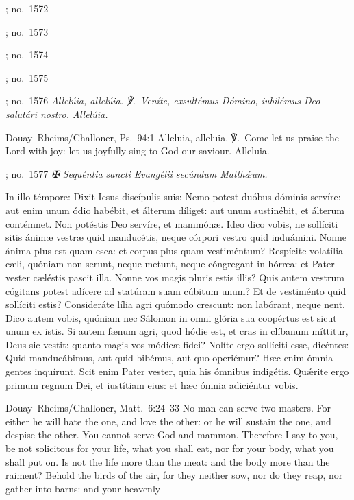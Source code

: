 \begin{massbox}{; no.~1572}
\begin{massbox}{; no.~1573}
\begin{massbox}{; no.~1574}
\begin{massbox}{; no.~1575}
\label{alleluia}
\begin{massbox}{; no.~1576}\itshape
Allelúia, allelúia. ℣.~Veníte, exsultémus Dómino, iubilémus Deo salutári
nostro. Allelúia.
\finishfulltextelement
\begin{fulltextenglish}{Douay--Rheims/Challoner, Ps.~94:1}
Alleluia, alleluia. ℣.~Come let us praise the Lord with joy: let us joyfully
sing to God our saviour. Alleluia.
\end{fulltextenglish}

\label{gospel}
\begin{massbox}{; no.~1577}\itshape
✠ Sequéntia sancti Evangélii secúndum Matthǽum.

In illo témpore: Dixit Iesus discípulis suis: Nemo potest duóbus dóminis
servíre: aut enim unum ódio habébit, et álterum díliget: aut unum sustinébit,
et álterum contémnet. Non potéstis Deo servíre, et mammónæ. Ideo dico vobis,
ne sollíciti sitis ánimæ vestræ quid manducétis, neque córpori vestro quid
induámini. Nonne ánima plus est quam esca: et corpus plus quam vestiméntum?
Respícite volatília cæli, quóniam non serunt, neque metunt, neque cóngregant
in hórrea: et Pater vester cæléstis pascit illa. Nonne vos magis pluris estis
illis? Quis autem vestrum cógitans potest adícere ad statúram suam cúbitum
unum? Et de vestiménto quid sollíciti estis? Consideráte lília agri quómodo
crescunt: non labórant, neque nent. Dico autem vobis, quóniam nec Sálomon in
omni glória sua coopértus est sicut unum ex istis. Si autem fænum agri, quod
hódie est, et cras in clíbanum míttitur, Deus sic vestit: quanto magis vos
módicæ fidei? Nolíte ergo sollíciti esse, dicéntes: Quid manducábimus, aut
quid bibémus, aut quo operiémur? Hæc enim ómnia gentes inquírunt. Scit enim
Pater vester, quia his ómnibus indigétis. Quǽrite ergo primum regnum Dei, et
iustítiam eius: et hæc ómnia adiciéntur vobis.
\finishfulltextelement
\begin{fulltextenglish}{Douay--Rheims/Challoner, Matt.~6:24--33}
No man can serve two masters. For either he will hate the one, and love the
other: or he will sustain the one, and despise the other. You cannot serve God
and mammon. Therefore I say to you, be not solicitous for your life, what you
shall eat, nor for your body, what you shall put on. Is not the life more than
the meat: and the body more than the raiment? Behold the birds of the air, for
they neither sow, nor do they reap, nor gather into barns: and your heavenly

\end{fulltextenglish}
\end{massbox}
\end{massbox}
\end{massbox}
\end{massbox}
\end{massbox}
\end{massbox}
